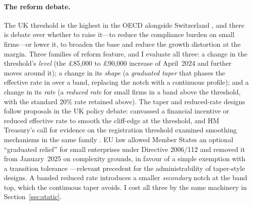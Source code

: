 \paragraph{The reform debate.} The UK threshold is the highest in the OECD
alongside Switzerland \citep{hmrc_threshold},
and there is debate over whether to raise it---to reduce the compliance burden on
small firms---or lower it, to broaden the base and reduce the growth distortion at
the margin. Three families of reform feature, and I evaluate all three: a change in
the threshold's \emph{level} (the \pounds85{,}000 to \pounds90{,}000 increase
of April~2024 and further moves around it); a change in its \emph{shape} (a
\emph{graduated taper} that phases the effective rate in over a band, replacing the
notch with a continuous profile); and a change in its \emph{rate} (a \emph{reduced
rate} for small firms in a band above the threshold, with the standard 20\% rate
retained above). The taper and reduced-rate designs follow proposals in the UK
policy debate: \citet{ots2017vat} canvassed a financial incentive or reduced
effective rate to smooth the cliff-edge at the threshold, and HM Treasury's
call for evidence on the registration threshold examined smoothing mechanisms
in the same family \citep{hmt2018cfe}. EU law allowed Member States an
optional ``graduated relief'' for small enterprises under Directive 2006/112
and removed it
from January~2025 on complexity grounds, in favour of a simple exemption with
a transition tolerance \citep{eudirective2020285}---relevant precedent for the
administrability of taper-style designs. A banded reduced rate introduces a
smaller \emph{secondary} notch at the band top, which the continuous taper
avoids. I cost all three by the same machinery in Section~\ref{sec:static}.

